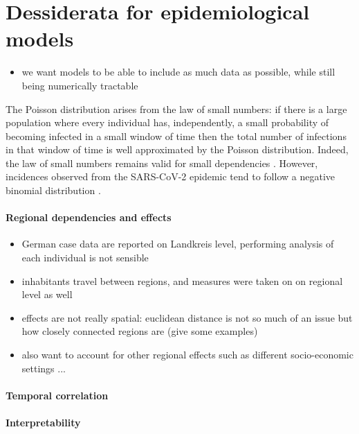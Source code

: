 \section{Dessiderata for epidemiological models}
\label{sec:dessiderata}

\begin{itemize}
    \item we want models to be able to include as much data as possible, while still being numerically tractable 
\end{itemize}

The Poisson distribution arises from the law of small numbers: if there is a large population where every individual has, independently, a small probability of becoming infected in a small window of time then the total number of infections in that window of time is well approximated by the Poisson distribution.
Indeed, the law of small numbers remains valid for small dependencies \cite{Ross2011Fundamentalsa,Arratia1990Poisson}.
However, incidences observed from the SARS-CoV-2 epidemic tend to follow a negative binomial distribution \cite{Chan2021Count}. 




\paragraph{Regional dependencies and effects}
\begin{itemize}
    \item German case data are reported on Landkreis level, performing analysis of each individual is not sensible 
    \item inhabitants travel between regions, and measures were taken on on regional level as well
    \item effects are not really spatial: euclidean distance is not so much of an issue but how closely connected regions are (give some examples)
    \item also want to account for other regional effects such as different socio-economic settings ... 
\end{itemize}

\paragraph{Temporal correlation}

\paragraph{Interpretability}